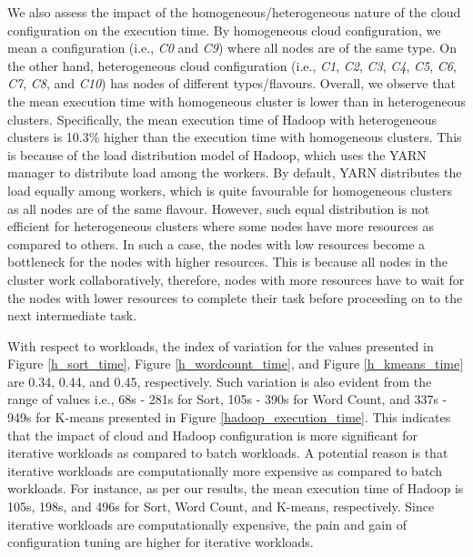 \documentclass[3p]{elsarticle}
\begin{document}
We also assess the impact of the homogeneous/heterogeneous nature of the cloud configuration on the execution time. By homogeneous cloud configuration, we mean a configuration (i.e., \textit{C0} and \textit{C9}) where all nodes are of the same type. On the other hand, heterogeneous cloud configuration (i.e., \textit{C1}, \textit{C2}, \textit{C3}, \textit{C4}, \textit{C5}, \textit{C6}, \textit{C7}, \textit{C8}, and \textit{C10}) has nodes of different types/flavours. Overall, we observe that the mean execution time with homogeneous cluster is lower than in heterogeneous clusters. Specifically, the mean execution time of Hadoop with heterogeneous clusters is 10.3\% higher than the execution time with homogeneous clusters. This is because of the load distribution model of Hadoop, which uses the YARN manager to distribute load among the workers. By default, YARN distributes the load equally among workers, which is quite favourable for homogeneous clusters as all nodes are of the same flavour. However, such equal distribution is not efficient for heterogeneous clusters where some nodes have more resources as compared to others. In such a case, the nodes with low resources become a bottleneck for the nodes with higher resources. This is because all nodes in the cluster work collaboratively, therefore, nodes with more resources have to wait for the nodes with lower resources to complete their task before proceeding on to the next intermediate task.



With respect to workloads, the index of variation for the values presented in Figure \ref{h_sort_time}, Figure \ref{h_wordcount_time}, and Figure \ref{h_kmeans_time} are 0.34, 0.44, and 0.45, respectively. Such variation is also evident from the range of values i.e., 68s - 281s for Sort, 105s - 390s for Word Count, and 337s - 949s for K-means presented in Figure \ref{hadoop_execution_time}. This indicates that the impact of cloud and Hadoop configuration is more significant for iterative workloads as compared to batch workloads. A potential reason is that iterative workloads are computationally more expensive as compared to batch workloads. For instance, as per our results, the mean execution time of Hadoop is 105s, 198s, and 496s for Sort, Word Count, and K-means, respectively. Since iterative workloads are computationally expensive, the pain and gain of configuration tuning are higher for iterative workloads. 
\end{document}
